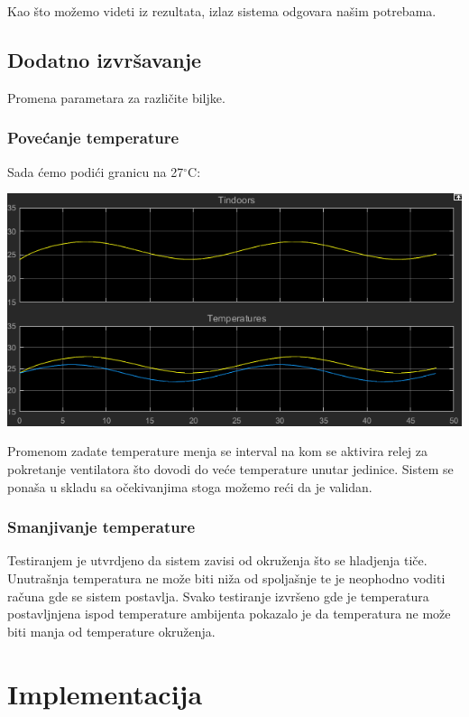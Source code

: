 \documentclass[a4paper,11pt]{book}
\begin{document}
Kao što možemo videti iz rezultata, izlaz sistema odgovara našim potrebama.

\section{Dodatno izvršavanje}

Promena parametara za različite biljke.

\subsection{Povećanje temperature}

Sada ćemo podići granicu na 27$^\circ$C:

\includegraphics[width=\textwidth]{done27.png}

Promenom zadate temperature menja se interval na kom se aktivira relej za pokretanje ventilatora što dovodi do veće temperature unutar jedinice. Sistem se ponaša u skladu sa očekivanjima stoga možemo reći da je validan.\\

\subsection{Smanjivanje temperature}

Testiranjem je utvrdjeno da sistem zavisi od okruženja što se hladjenja tiče. Unutrašnja temperatura ne može biti niža od spoljašnje te je neophodno voditi računa gde se sistem postavlja. Svako testiranje izvršeno gde je temperatura postavljnjena ispod temperature ambijenta pokazalo je da temperatura ne može biti manja od temperature okruženja.

\chapter{Implementacija}
\end{document}
